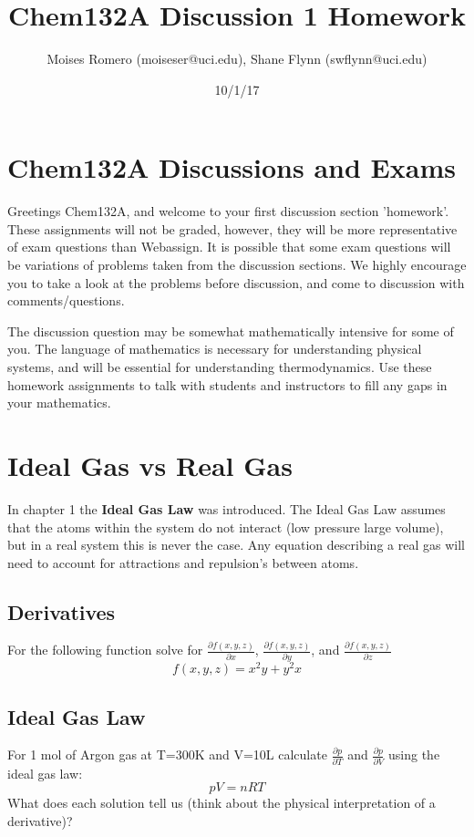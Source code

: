 \documentclass{article}
\title{Chem132A Discussion 1 Homework}
\author{Moises Romero (moiseser@uci.edu), Shane Flynn (swflynn@uci.edu) }
\date{10/1/17}
\newcommand{\be}{\begin{equation}}
\newcommand{\ee}{\end{equation}}
\newcommand{\pd}{\partial}
\begin{document}
\maketitle

\section*{Chem132A Discussions and Exams}
Greetings Chem132A, and welcome to your first discussion section 'homework'. 
These assignments will not be graded, however, they will be more representative of exam questions than Webassign.
It is possible that some exam questions will be variations of problems taken from the discussion sections. 
We highly encourage you to take a look at the problems before discussion, and come to discussion with comments/questions. 

The discussion question may be somewhat mathematically intensive for some of you.
The language of mathematics is necessary for understanding physical systems, and will be essential for understanding thermodynamics.
Use these homework assignments to talk with students and instructors to fill any gaps in your mathematics. 


\section{Ideal Gas vs Real Gas}
In chapter 1 the \textbf{Ideal Gas Law} was introduced.
The Ideal Gas Law assumes that the atoms within the system do not interact (low pressure large volume), but in a real system this is never the case.
Any equation describing a real gas will need to account for attractions and repulsion's between atoms.

\subsection{Derivatives}
For the following function solve for $\frac{\pd f(x,y,z)}{\pd x}$, $\frac{\pd f(x,y,z)}{\pd y}$, and $\frac{\pd f(x,y,z)}{\pd z}$
\be
f(x,y,z)=x^2y + y^2x
\ee

\subsection{Ideal Gas Law}
For 1 mol of Argon gas at T=300K and V=10L calculate $\frac{\pd p}{\pd T}$ and $\frac{\pd p}{\pd V}$  using the ideal gas law:
\be
pV=nRT
\ee
What does each solution tell us (think about the physical interpretation of a derivative)?
\end{document}
